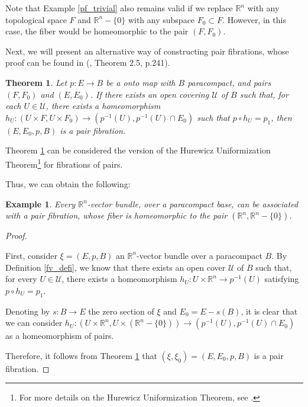 \documentclass[12pt,oneside]{book}
\newtheorem{teo}    {Theorem}[chapter]
\newtheorem{ex}     {Example}[chapter]
\newcommand{\R}{\mathbb{R}}
\begin{document}
    Note that Example \ref{pf_trivial} also remains valid if we replace $\R^{n}$ with any topological space $F$ and $\R^{n}-\{ 0 \}$ with 
    any subspace $F_{0}\subset F$. However, in this case, the fiber would be homeomorphic to the pair $(F,F_{0})$.
    
    Next, we will present an alternative way of constructing pair fibrations, whose proof can be found in (\cite{allaud}, Theorem 2.5, p.241).
    
    \begin{teo}\label{teo_hurewicz}
        Let $p:E\to B$ be a onto map with $B$ paracompact, and pairs $(F,F_{0})$ and $(E,E_{0})$. If there exists an open covering 
        $\mathcal{U}$ of $B$ such that, for each $U\in\mathcal{U}$, there exists a homeomorphism 
        $h_{U}:(U\times F,U\times F_{0})\to (p^{-1}(U),p^{-1}(U)\cap E_{0})$ such that $p\circ h_{U}=p_{1}$, then $(E,E_{0},p,B)$ is a pair 
        fibration.
    \end{teo}

    Theorem \ref{teo_hurewicz} can be considered the version of the Hurewicz Uniformization Theorem\footnote{For more details on the Hurewicz Uniformization Theorem, see \cite{hurewicz}.} for fibrations of pairs.

    Thus, we can obtain the following:
    
    \begin{ex}\label{pf_fv}
        Every $\R^{n}$-vector bundle, over a paracompact base, can be associated with a pair 
        fibration, whose fiber is homeomorphic to the pair $(\R^{n},\R^{n}-\{ 0 \})$.
    \end{ex}
    \begin{proof}
    
    \
    
    First, consider $\xi=(E,p,B)$ an $\R^{n}$-vector bundle over a paracompact $B$. By Definition \ref{fv_defi}, we know that there exists an 
    open cover $\mathcal{U}$ of $B$ such that, for every $U\in\mathcal{U}$, there exists a homeomorphism $h_{U}:U\times\R^{n}\to p^{-1}(U)$ 
    satisfying $p\circ h_{U}=p_{1}$.
    
    Denoting by $s:B\to E$ the zero section of $\xi$ and $E_{0}=E-s(B)$, it is clear that we can consider 
    $h_{U}:(U\times\R^{n},U\times(\R^{n}-\{ 0 \}))\to (p^{-1}(U),p^{-1}(U)\cap E_{0})$ as a homeomorphism of pairs.
    
    Therefore, it follows from Theorem \ref{teo_hurewicz} that $(\xi,\xi_{0})=(E,E_{0},p,B)$ is a pair fibration.
    
    \end{proof}
    
\end{document}
